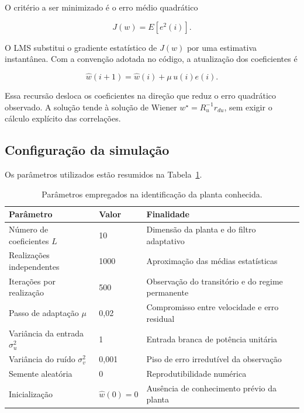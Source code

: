 \documentclass[11pt,a4paper,oneside]{report}
\newcommand{\what}{\widehat{w}}
\begin{document}
O critério a ser minimizado é o erro médio quadrático

\begin{equation}
    J(w)=E[e^2(i)].
\end{equation}

O LMS substitui o gradiente estatístico de \(J(w)\) por uma estimativa instantânea. Com a
convenção adotada no código, a atualização dos coeficientes é

\begin{equation}
    \what(i+1)=\what(i)+\mu\,{u}(i)e(i).
\end{equation}

Essa recursão desloca os coeficientes na direção que reduz o erro quadrático observado. A solução tende
à solução de Wiener \(w^{\star}=R_u^{-1}r_{du}\), sem exigir o cálculo explícito das
correlações.

\clearpage

\subsection{Configuração da simulação}

Os parâmetros utilizados estão resumidos na Tabela~\ref{tab:parametros}.

\begin{table}[H]
    \centering
    \caption{Parâmetros empregados na identificação da planta conhecida.}
    \label{tab:parametros}
    \begin{tabular}{p{5.0cm} p{3.2cm} p{5.2cm}}
        \toprule
        \textbf{Parâmetro} & \textbf{Valor} & \textbf{Finalidade} \\
        \midrule
        Número de coeficientes \(L\) & 10 & Dimensão da planta e do filtro adaptativo \\
        Realizações independentes & 1000 & Aproximação das médias estatísticas \\
        Iterações por realização & 500 & Observação do transitório e do regime permanente \\
        Passo de adaptação \(\mu\) & 0,02 & Compromisso entre velocidade e erro residual \\
        Variância da entrada \(\sigma_u^2\) & 1 & Entrada branca de potência unitária \\
        Variância do ruído \(\sigma_v^2\) & 0,001 & Piso de erro irredutível da observação \\
        Semente aleatória & 0 & Reprodutibilidade numérica \\
        Inicialização & \(\what(0)=0\) & Ausência de conhecimento prévio da planta \\
        \bottomrule
    \end{tabular}
\end{table}
\end{document}

